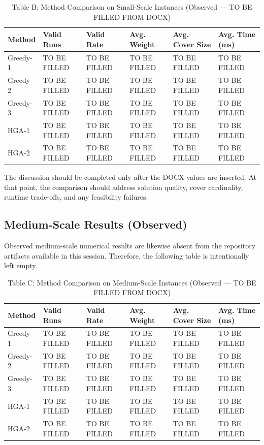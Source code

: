 \documentclass[11pt]{article}
\begin{document}
\begin{table}[h]
\centering
\caption{Table B: Method Comparison on Small-Scale Instances (Observed --- TO BE FILLED FROM DOCX)}
\label{tab:small-results}
\begin{tabular}{llllll}
\toprule
Method & Valid Runs & Valid Rate & Avg. Weight & Avg. Cover Size & Avg. Time (ms) \\
\midrule
Greedy-1 & TO BE FILLED & TO BE FILLED & TO BE FILLED & TO BE FILLED & TO BE FILLED \\
Greedy-2 & TO BE FILLED & TO BE FILLED & TO BE FILLED & TO BE FILLED & TO BE FILLED \\
Greedy-3 & TO BE FILLED & TO BE FILLED & TO BE FILLED & TO BE FILLED & TO BE FILLED \\
HGA-1 & TO BE FILLED & TO BE FILLED & TO BE FILLED & TO BE FILLED & TO BE FILLED \\
HGA-2 & TO BE FILLED & TO BE FILLED & TO BE FILLED & TO BE FILLED & TO BE FILLED \\
\bottomrule
\end{tabular}
\end{table}

The discussion should be completed only after the DOCX values are inserted. At that point, the comparison should address solution quality, cover cardinality, runtime trade-offs, and any feasibility failures.

\subsection{Medium-Scale Results (Observed)}

Observed medium-scale numerical results are likewise absent from the repository artifacts available in this session. Therefore, the following table is intentionally left empty.

\begin{table}[h]
\centering
\caption{Table C: Method Comparison on Medium-Scale Instances (Observed --- TO BE FILLED FROM DOCX)}
\label{tab:medium-results}
\begin{tabular}{llllll}
\toprule
Method & Valid Runs & Valid Rate & Avg. Weight & Avg. Cover Size & Avg. Time (ms) \\
\midrule
Greedy-1 & TO BE FILLED & TO BE FILLED & TO BE FILLED & TO BE FILLED & TO BE FILLED \\
Greedy-2 & TO BE FILLED & TO BE FILLED & TO BE FILLED & TO BE FILLED & TO BE FILLED \\
Greedy-3 & TO BE FILLED & TO BE FILLED & TO BE FILLED & TO BE FILLED & TO BE FILLED \\
HGA-1 & TO BE FILLED & TO BE FILLED & TO BE FILLED & TO BE FILLED & TO BE FILLED \\
HGA-2 & TO BE FILLED & TO BE FILLED & TO BE FILLED & TO BE FILLED & TO BE FILLED \\
\bottomrule
\end{tabular}
\end{table}
\end{document}
